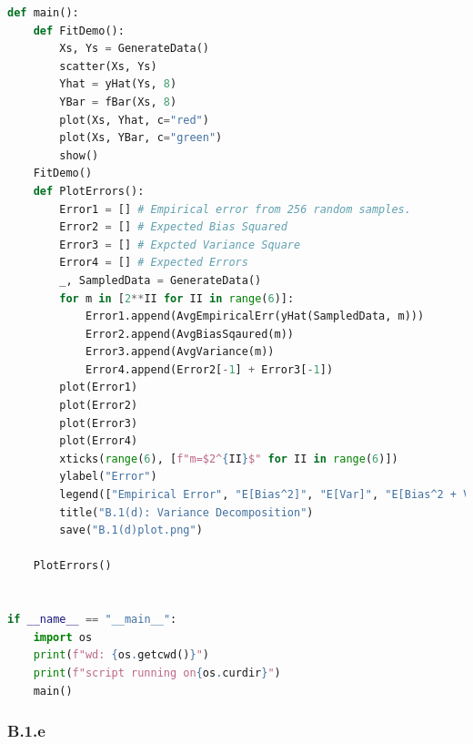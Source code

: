 \documentclass[]{article}
\begin{document}
\begin{lstlisting}[language=python]
def main():
    def FitDemo():
        Xs, Ys = GenerateData()
        scatter(Xs, Ys)
        Yhat = yHat(Ys, 8)
        YBar = fBar(Xs, 8)
        plot(Xs, Yhat, c="red")
        plot(Xs, YBar, c="green")
        show()
    FitDemo()
    def PlotErrors():
        Error1 = [] # Empirical error from 256 random samples.
        Error2 = [] # Expected Bias Squared
        Error3 = [] # Expcted Variance Square
        Error4 = [] # Expected Errors
        _, SampledData = GenerateData()
        for m in [2**II for II in range(6)]:
            Error1.append(AvgEmpiricalErr(yHat(SampledData, m)))
            Error2.append(AvgBiasSqaured(m))
            Error3.append(AvgVariance(m))
            Error4.append(Error2[-1] + Error3[-1])
        plot(Error1)
        plot(Error2)
        plot(Error3)
        plot(Error4)
        xticks(range(6), [f"m=$2^{II}$" for II in range(6)])
        ylabel("Error")
        legend(["Empirical Error", "E[Bias^2]", "E[Var]", "E[Bias^2 + Var]"])
        title("B.1(d): Variance Decomposition")
        save("B.1(d)plot.png")

    PlotErrors()


if __name__ == "__main__":
    import os
    print(f"wd: {os.getcwd()}")
    print(f"script running on{os.curdir}")
    main()
        \end{lstlisting}
    \subsubsection*{B.1.e}
        
        
\end{document}
